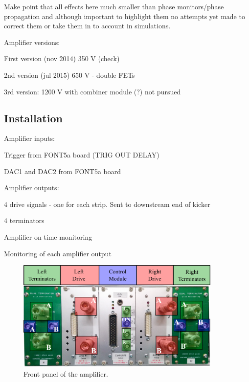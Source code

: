 
Make point that all effects here much smaller than phase monitors/phase propagation and although important to highlight them no attempts yet made to correct them or take them in to account in simulations.

Amplifier versions:

First version (nov 2014) 350 V (check)

2nd version  (jul 2015) 650 V - double FETs

3rd version: 1200 V with combiner module (?) not pursued

\subsection{Installation}
\label{ss:ampInstallation}


Amplifier inputs:

Trigger from FONT5a board (TRIG OUT DELAY)

DAC1 and DAC2 from FONT5a board


Amplifier outputs:

4 drive signals - one for each strip. Sent to downstream end of kicker

4 terminators

Amplifier on time monitoring

Monitoring of each amplifier output

\begin{figure}
  \centering
  \includegraphics[width=0.9\textwidth]{Figures/commissioning/AmplifierPanelPic}
  \caption{Front panel of the amplifier.}
  \label{f:AmplifierPanelPic}
\end{figure}


